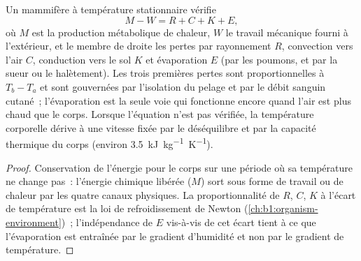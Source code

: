 \begin{proposition}\label{prop:b1:mammal-organization:heatbudget}
Un mammifère à température stationnaire vérifie
\[
M - W = R + C + K + E ,
\]
où $M$ est la production métabolique de chaleur, $W$ le travail
mécanique fourni à l'extérieur, et le membre de droite les pertes par
rayonnement $R$, convection vers l'air $C$, conduction vers le sol $K$
et évaporation $E$ (par les poumons, et par la sueur ou le halètement).
Les trois premières pertes sont proportionnelles à $T_b - T_a$ et sont
gouvernées par l'isolation du pelage et par le débit sanguin cutané~;
l'évaporation est la seule voie qui fonctionne encore quand l'air est
plus chaud que le corps. Lorsque l'équation n'est pas vérifiée, la
température corporelle dérive à une vitesse fixée par le déséquilibre et
par la capacité thermique du corps (environ
\qty{3.5}{kJ.kg^{-1}.K^{-1}}).
\end{proposition}
\begin{proof}
Conservation de l'énergie pour le corps sur une période où sa
température ne change pas~: l'énergie chimique libérée ($M$) sort sous
forme de travail ou de chaleur par les quatre canaux physiques. La
proportionnalité de $R$, $C$, $K$ à l'écart de température est la loi de
refroidissement de Newton (\cref{ch:b1:organism-environment})~;
l'indépendance de $E$ vis-à-vis de cet écart tient à ce que
l'évaporation est entraînée par le gradient d'humidité et non par le
gradient de température.
\end{proof}

